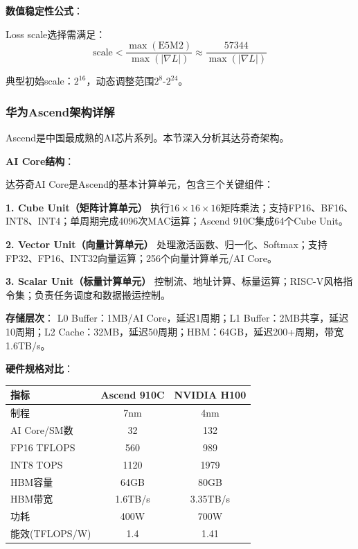 \textbf{数值稳定性公式}：

Loss scale选择需满足：
\begin{equation}
\text{scale} < \frac{\max(\text{E5M2})}{\max(|\nabla L|)} \approx \frac{57344}{\max(|\nabla L|)}
\end{equation}

典型初始scale：$2^{16}$，动态调整范围$2^{8}$-$2^{24}$。

\subsubsection{华为Ascend架构详解}

Ascend是中国最成熟的AI芯片系列。本节深入分析其达芬奇架构\cite{Huawei2024Ascend, HotChips2024Ascend}。

\textbf{AI Core结构}：

达芬奇AI Core是Ascend的基本计算单元，包含三个关键组件：

\textbf{1. Cube Unit（矩阵计算单元）}
执行$16 \times 16 \times 16$矩阵乘法；支持FP16、BF16、INT8、INT4；单周期完成4096次MAC运算；Ascend 910C集成64个Cube Unit。

\textbf{2. Vector Unit（向量计算单元）}
处理激活函数、归一化、Softmax；支持FP32、FP16、INT32向量运算；256个向量计算单元/AI Core。

\textbf{3. Scalar Unit（标量计算单元）}
控制流、地址计算、标量运算；RISC-V风格指令集；负责任务调度和数据搬运控制。

\textbf{存储层次}：
L0 Buffer：1MB/AI Core，延迟1周期；L1 Buffer：2MB共享，延迟10周期；L2 Cache：32MB，延迟50周期；HBM：64GB，延迟200+周期，带宽1.6TB/s。

\textbf{硬件规格对比}：

\begin{table}[H]
\centering
\small
\begin{tabular}{lcc}
\toprule
\textbf{指标} & \textbf{Ascend 910C} & \textbf{NVIDIA H100} \\
\midrule
制程 & 7nm & 4nm \\
AI Core/SM数 & 32 & 132 \\
FP16 TFLOPS & 560 & 989 \\
INT8 TOPS & 1120 & 1979 \\
HBM容量 & 64GB & 80GB \\
HBM带宽 & 1.6TB/s & 3.35TB/s \\
功耗 & 400W & 700W \\
能效(TFLOPS/W) & 1.4 & 1.41 \\
\bottomrule
\end{tabular}
\end{table}

